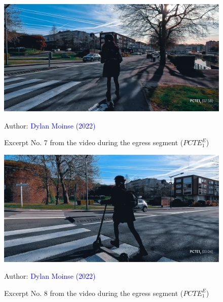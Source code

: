     \begin{figure}[h!]\vspace*{4pt}
        \caption*{Excerpt No. 7 from the video during the egress segment (\(PCTE^{E}_{1}\))}
        \centerline{\includegraphics[width=0.75\columnwidth]{src/Figures/Annexes/Extrait_Video_PCTE1_Egress_7.jpg}}
        \vspace{5pt}
        \begin{flushright}\scriptsize{
        Author: \textcolor{blue}{Dylan Moinse (2022)}
        }\end{flushright}
    \end{figure}

    \begin{figure}[h!]\vspace*{4pt}
        \caption*{Excerpt No. 8 from the video during the egress segment (\(PCTE^{E}_{1}\))}
        \centerline{\includegraphics[width=0.75\columnwidth]{src/Figures/Annexes/Extrait_Video_PCTE1_Egress_8.jpg}}
        \vspace{5pt}
        \begin{flushright}\scriptsize{
        Author: \textcolor{blue}{Dylan Moinse (2022)}
        }\end{flushright}
    \end{figure}

